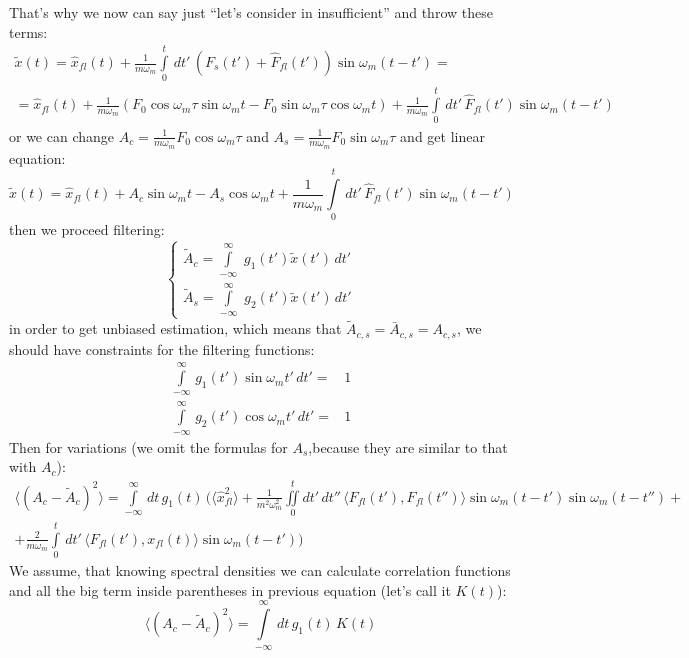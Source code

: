 \documentclass[notitlepage,a4paper,11pt,hyperref=pdftex]{revtex4-1}
\newcommand{\mean}[1]{\langle#1\rangle}
\newcommand{\I}[2]{\int\limits_{#1}^{#2}\,}
\begin{document}
That's why we now can say just ``let's consider in insufficient'' and throw these terms:
\begin{multline}
 \tilde{x}(t) = \hat{x}_{fl}(t) + \frac{1}{m\omega_m}\I{0}{t}dt'\,(F_s(t') + \hat{F}_{fl}(t'))\sin\omega_m(t-t') =\\
= \hat{x}_{fl}(t) + \frac{1}{m\omega_m}(F_0\cos\omega_m\tau \sin\omega_mt - F_0\sin\omega_m\tau\cos\omega_mt) + \frac{1}{m\omega_m}\I{0}{t}dt'\,\hat{F}_{fl}(t')\sin\omega_m(t-t')
\end{multline}
or we can change $A_c = \frac{1}{m\omega_m}F_0\cos\omega_m\tau$ and $A_s = \frac{1}{m\omega_m}F_0\sin\omega_m\tau$ and get linear equation:
\begin{equation}
 \tilde{x}(t)=\hat{x}_{fl}(t) + A_c\sin\omega_mt - A_s\cos\omega_mt + \frac{1}{m\omega_m}\I{0}{t}dt'\,\hat{F}_{fl}(t')\sin\omega_m(t-t')
\end{equation}
then we proceed filtering:
\begin{equation}
 \begin{cases}
  \tilde{A}_c = \I{-\infty}{\infty}\,g_1(t')\tilde{x}(t')\,dt'\\
\tilde{A}_s = \I{-\infty}{\infty}\,g_2(t')\tilde{x}(t')\,dt'
 \end{cases}
\end{equation}
in order to get unbiased estimation, which means that $\tilde{A}_{c,s} = \bar{A}_{c,s} = A_{c,s}$, we should have constraints for the filtering functions:
\begin{align}
 \I{-\infty}{\infty}g_1(t')\sin\omega_mt'\,dt' =& 1\\
 \I{-\infty}{\infty}g_2(t')\cos\omega_mt'\,dt' =&1
\end{align}
Then for variations (we omit the formulas for $A_s$,because they are similar to that with $A_c$):
\begin{multline}
 \mean{(A_c-\tilde{A}_c)^2} = \I{-\infty}{\infty}dt\,g_1(t)\,\bigl(\mean{\hat{x}_{fl}^2} +\frac{1}{m^2\omega_m^2}\iint\limits_{0}^{t}dt'\,dt''\,\mean{F_{fl}(t'),F_{fl}(t'')}\sin\omega_m(t-t')\sin\omega_m(t-t'')+\\
+ \frac{2}{m\omega_m}\I{0}{t}dt'\,\mean{F_{fl}(t'),x_{fl}(t)}\sin\omega_m(t-t')\bigr) 
\end{multline}
We assume, that knowing spectral densities we can calculate correlation functions and all the big term inside parentheses in previous equation (let's call it $K(t)$):
\begin{equation}
 \mean{(A_c-\tilde{A}_c)^2} = \I{-\infty}{\infty}dt\,g_1(t)\,K(t)
\end{equation}
\end{document}
